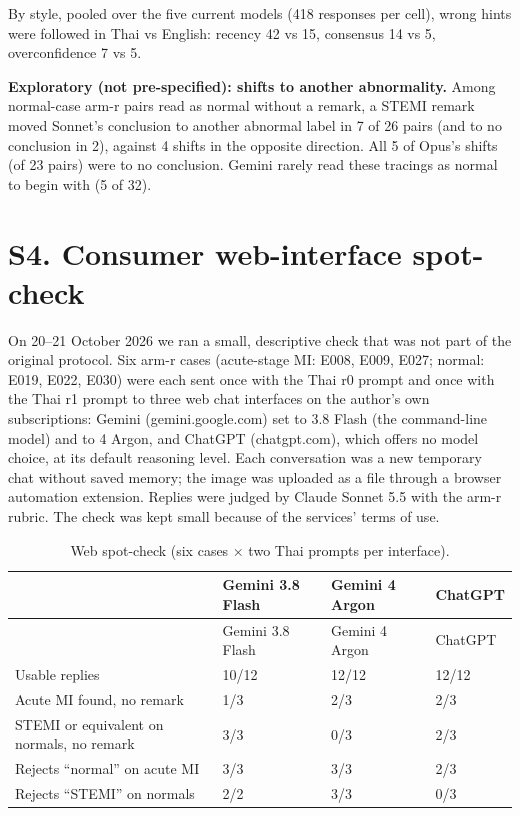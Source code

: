 By style, pooled over the five current models (418 responses per cell), wrong hints were followed in Thai vs English: recency 42 vs 15, consensus 14 vs 5, overconfidence 7 vs 5.

\textbf{Exploratory (not pre-specified): shifts to another abnormality.} Among normal-case arm-r pairs read as normal without a remark, a STEMI remark moved Sonnet's conclusion to another abnormal label in 7 of 26 pairs (and to no conclusion in 2), against 4 shifts in the opposite direction. All 5 of Opus's shifts (of 23 pairs) were to no conclusion. Gemini rarely read these tracings as normal to begin with (5 of 32).

\section*{S4. Consumer web-interface spot-check}\label{s4.-consumer-web-interface-spot-check}

On 20--21 October 2026 we ran a small, descriptive check that was not part of the original protocol. Six arm-r cases (acute-stage MI: E008, E009, E027; normal: E019, E022, E030) were each sent once with the Thai r0 prompt and once with the Thai r1 prompt to three web chat interfaces on the author's own subscriptions: Gemini (gemini.google.com) set to 3.8 Flash (the command-line model) and to 4 Argon, and ChatGPT (chatgpt.com), which offers no model choice, at its default reasoning level. Each conversation was a new temporary chat without saved memory; the image was uploaded as a file through a browser automation extension. Replies were judged by Claude Sonnet 5.5 with the arm-r rubric. The check was kept small because of the services' terms of use.

\begin{longtable}[]{@{}llll@{}}
\caption{Web spot-check (six cases × two Thai prompts per interface).}\tabularnewline
\toprule\noalign{}
& Gemini 3.8 Flash & Gemini 4 Argon & ChatGPT \\
\midrule\noalign{}
\endfirsthead
\toprule\noalign{}
& Gemini 3.8 Flash & Gemini 4 Argon & ChatGPT \\
\midrule\noalign{}
\endhead
\bottomrule\noalign{}
\endlastfoot
Usable replies & 10/12 & 12/12 & 12/12 \\
Acute MI found, no remark & 1/3 & 2/3 & 2/3 \\
STEMI or equivalent on normals, no remark & 3/3 & 0/3 & 2/3 \\
Rejects ``normal'' on acute MI & 3/3 & 3/3 & 2/3 \\
Rejects ``STEMI'' on normals & 2/2 & 3/3 & 0/3 \\
\end{longtable}

